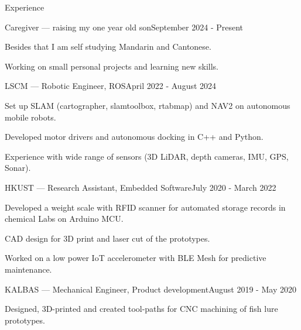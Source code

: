 \documentclass[
	a4paper, %
	11pt, %
]{resume} %
\begin{document}
\begin{rSection}{Experience}

	\begin{rSubsection}{Caregiver --- raising my one year old son}{September 2024 - Present}{}{}
		\item Besides that I am self studying Mandarin and Cantonese.
		\item Working on small personal projects and learning new skills.
	\end{rSubsection}


	\begin{rSubsection}{LSCM --- Robotic Engineer, ROS}{April 2022 - August 2024}{}{}
		\item Set up SLAM (cartographer, slamtoolbox, rtabmap) and NAV2 on autonomous mobile robots.
		\item Developed motor drivers and autonomous docking in C++ and Python.
		\item Experience with wide range of sensors (3D LiDAR, depth cameras, IMU, GPS, Sonar).
	\end{rSubsection}


	\begin{rSubsection}{HKUST --- Research Assistant, Embedded Software}{July 2020 - March 2022}{}{}
		\item Developed a weight scale with RFID scanner for automated storage records in chemical Labs on Arduino MCU.
		\item CAD design for 3D print and laser cut of the prototypes.
		\item Worked on a low power IoT accelerometer with BLE Mesh for predictive maintenance.
	\end{rSubsection}


	\begin{rSubsection}{KALBAS --- Mechanical Engineer, Product development}{August 2019 - May 2020}{}{}
		\item Designed, 3D-printed and created tool-paths for CNC machining of fish lure prototypes.
	\end{rSubsection}

\end{rSection}



\end{document}
